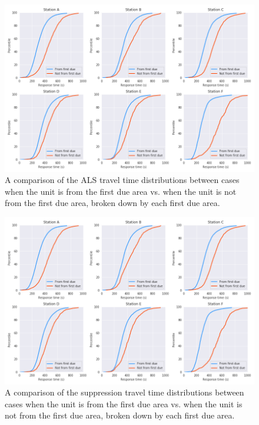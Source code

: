 \documentclass[article]{proc}
\begin{document}
\begin{figure}[!htb]
  \centering
  \includegraphics[width=16cm,keepaspectratio]{Figures/alsdiff.png}
  \caption{A comparison of the ALS travel time distributions between cases when the unit is from the first due area vs. when the unit is not from the first due area, broken down by each first due area.}
  \label{fig:alsdiff}
\end{figure}

\begin{figure}[!htb]
  \centering
  \includegraphics[width=16cm,keepaspectratio]{Figures/alsdiff.png}
  \caption{A comparison of the suppression travel time distributions between cases when the unit is from the first due area vs. when the unit is not from the first due area, broken down by each first due area.}
  \label{fig:firediff}
\end{figure}
\end{document}
